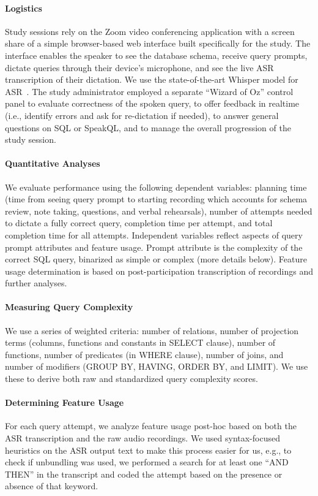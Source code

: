 \paragraph{\textbf{Logistics}} 
Study sessions rely on the Zoom video conferencing application with a screen share of a simple browser-based web interface built specifically for the study. 
The interface enables the speaker to see the database schema, receive query prompts, dictate queries through their device's microphone, and see the live ASR transcription of their dictation. 
We use the state-of-the-art Whisper model for ASR~\cite{https://doi.org/10.48550/arxiv.2212.04356}. 
The study administrator employed a separate ``Wizard of Oz'' control panel to evaluate correctness of the spoken query, to offer feedback in realtime (i.e., identify errors and ask for re-dictation if needed), to answer general questions on SQL or SpeakQL, and to manage the overall progression of the study session. 

\paragraph{\textbf{Quantitative Analyses}}
We evaluate performance using the following dependent variables: planning time (time from seeing query prompt to starting recording which accounts for schema review, note taking, questions, and verbal rehearsals), number of attempts needed to dictate a fully correct query, completion time per attempt, and total completion time for all attempts.
Independent variables reflect aspects of query prompt attributes and feature usage. 
Prompt attribute is the complexity of the correct SQL query, binarized as simple or complex (more details below). 
Feature usage determination is based on post-participation transcription of recordings and further analyses. 

\paragraph{\textbf{Measuring Query Complexity}} 
We use a series of weighted criteria: number of relations, number of projection terms (columns, functions and constants in SELECT clause), number of functions, number of predicates (in WHERE clause), number of joins, and number of modifiers (GROUP BY, HAVING, ORDER BY, and LIMIT). 
We use these to derive both raw and standardized query complexity scores. 

\paragraph{\textbf{Determining Feature Usage}} 
For each query attempt, we analyze feature usage post-hoc based on both the ASR transcription and the raw audio recordings. 
We used syntax-focused heuristics on the ASR output text to make this process easier for us, e.g., to check if unbundling was used, we performed a search for at least one ``AND THEN'' in the transcript and coded the attempt based on the presence or absence of that keyword.



